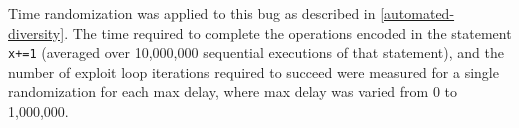 Time randomization was applied to this bug as described in \autoref{automated-diversity}.
The time required to complete the operations encoded in the statement \texttt{x+=1} (averaged over 10,000,000 sequential executions of that statement), and the number of exploit loop iterations required to succeed were measured for a single randomization for each max delay, where max delay was varied from 0 to 1,000,000.
